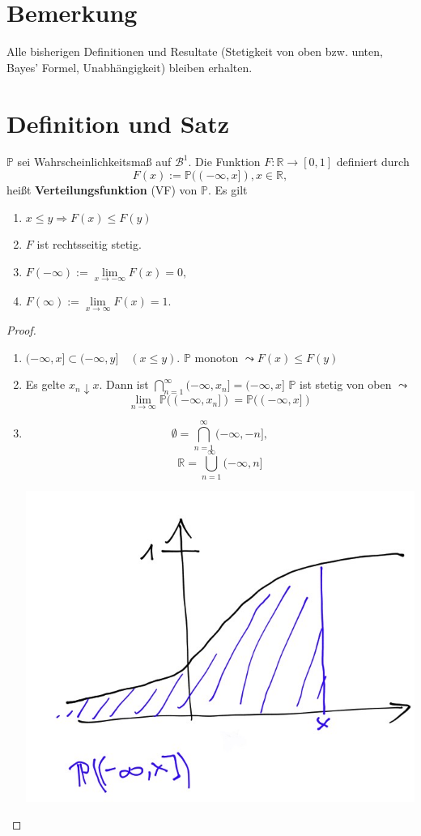 \documentclass[a4paper,11pt,notitlepage]{report}
\newcommand{\R}{{\ensuremath{\mathbb{R}}}}
\newcommand{\Prim}{{\ensuremath{\mathbb{P}}}}
\begin{document}
\section{Bemerkung}
Alle bisherigen Definitionen und Resultate (Stetigkeit von oben bzw. unten, Bayes' Formel, Unabhängigkeit) bleiben erhalten.

\section{Definition und Satz}
$\Prim$ sei Wahrscheinlichkeitsmaß auf $\mathcal{B}^1$.
\newline
Die Funktion $F \colon \R \rightarrow [0,1]$ definiert durch
$$F(x) := \Prim((-\infty, x]), x \in \R,$$
heißt \textbf{Verteilungsfunktion} (VF) von $\Prim$. Es gilt
\begin{enumerate}
	\item $x \leq y \Rightarrow F(x) \leq F(y)$
	\item $F$ ist rechtsseitig stetig.
	\item $F(-\infty) := \lim\limits_{x \rightarrow - \infty}{F(x)} = 0,$
	\item $F(\infty) := \lim\limits_{x \rightarrow \infty}{F(x)} = 1.$
\end{enumerate}

\begin{proof}
	\begin{enumerate}
		\item $(- \infty, x] \subset (- \infty, y] \quad (x \leq y)$.
		$\Prim$ monoton $\leadsto F(x) \leq F(y)$
		\item Es gelte $x_n \downarrow x$. Dann ist $\bigcap\limits_{n=1}^{\infty}{(- \infty, x_n]} = (- \infty, x]$
		\newline
		$\Prim$ ist stetig von oben $\leadsto$ 
		$$\lim\limits_{n \rightarrow \infty}{\Prim((- \infty, x_n])} = \Prim((- \infty, x])$$
		\item $$\emptyset = \bigcap\limits_{n=1}^{\infty}{(-\infty, -n]},$$
		$$\R = \bigcup\limits_{n=1}^{\infty}{(- \infty, n]}$$
		\begin{center}
			\includegraphics[scale=0.4]{bild.jpg}
		\end{center}
	\end{enumerate}
\end{proof}
\end{document}
